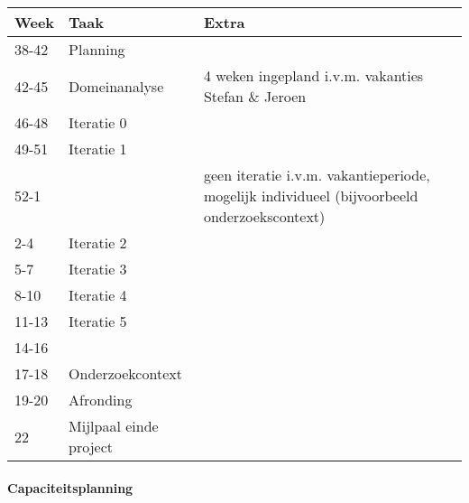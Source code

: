 \begin{tabular}{llp{10cm}}\hline
{\bf Week}    & {\bf Taak}  & {\bf Extra}\\\hline
38-42         & Planning    \\
42-45         & Domeinanalyse & 4 weken ingepland i.v.m. vakanties Stefan \& Jeroen \\
46-48         & Iteratie 0    \\
49-51         & Iteratie 1    \\
52-1          &               & geen iteratie i.v.m. vakantieperiode, mogelijk
				individueel (bijvoorbeeld onderzoekscontext) \\
2-4           & Iteratie 2    \\
5-7           & Iteratie 3    \\
8-10          & Iteratie 4    \\
11-13         & Iteratie 5    \\
14-16         &               \\
17-18         & Onderzoekcontext \\
19-20         & Afronding     \\
22            & Mijlpaal einde project

\end{tabular}

\pagebreak

\paragraph{Capaciteitsplanning}

